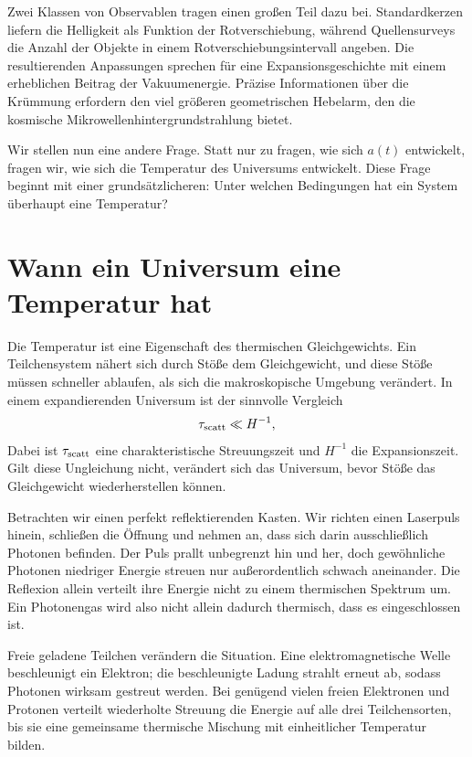 Zwei Klassen von Observablen tragen einen großen Teil dazu bei. Standardkerzen liefern die Helligkeit als Funktion der Rotverschiebung, während Quellensurveys die Anzahl der Objekte in einem Rotverschiebungsintervall angeben. Die resultierenden Anpassungen sprechen für eine Expansionsgeschichte mit einem erheblichen Beitrag der Vakuumenergie. Präzise Informationen über die Krümmung erfordern den viel größeren geometrischen Hebelarm, den die kosmische Mikrowellenhintergrundstrahlung bietet.

Wir stellen nun eine andere Frage. Statt nur zu fragen, wie sich \(a(t)\) entwickelt, fragen wir, wie sich die Temperatur des Universums entwickelt. Diese Frage beginnt mit einer grundsätzlicheren: Unter welchen Bedingungen hat ein System überhaupt eine Temperatur?

\section{Wann ein Universum eine Temperatur hat}

Die Temperatur ist eine Eigenschaft des thermischen Gleichgewichts. Ein Teilchensystem nähert sich durch Stöße dem Gleichgewicht, und diese Stöße müssen schneller ablaufen, als sich die makroskopische Umgebung verändert. In einem expandierenden Universum ist der sinnvolle Vergleich
\begin{equation}
\tau_{\rm scatt}\ll H^{-1},
\label{eq:c07-equilibrium-condition}
\end{equation}
Dabei ist \(\tau_{\rm scatt}\) eine charakteristische Streuungszeit und \(H^{-1}\) die Expansionszeit. Gilt diese Ungleichung nicht, verändert sich das Universum, bevor Stöße das Gleichgewicht wiederherstellen können.

Betrachten wir einen perfekt reflektierenden Kasten. Wir richten einen Laserpuls hinein, schließen die Öffnung und nehmen an, dass sich darin ausschließlich Photonen befinden. Der Puls prallt unbegrenzt hin und her, doch gewöhnliche Photonen niedriger Energie streuen nur außerordentlich schwach aneinander. Die Reflexion allein verteilt ihre Energie nicht zu einem thermischen Spektrum um. Ein Photonengas wird also nicht allein dadurch thermisch, dass es eingeschlossen ist.

Freie geladene Teilchen verändern die Situation. Eine elektromagnetische Welle beschleunigt ein Elektron; die beschleunigte Ladung strahlt erneut ab, sodass Photonen wirksam gestreut werden. Bei genügend vielen freien Elektronen und Protonen verteilt wiederholte Streuung die Energie auf alle drei Teilchensorten, bis sie eine gemeinsame thermische Mischung mit einheitlicher Temperatur bilden.

